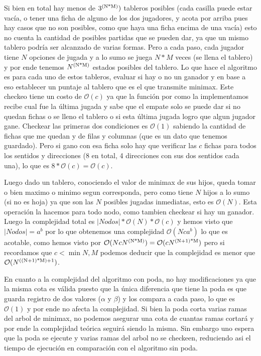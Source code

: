 \documentclass[A4paper,oneside,fleqn,11pt]{article}
\theoremstyle{definition}
\begin{document}
Si bien en total hay  menos de $3\textsuperscript{(N*M)})$ tableros posibles (cada casilla puede estar vacía, o tener una ficha de alguno de los dos jugadores, y acota por arriba pues hay casos que no son posibles, como que haya una ficha encima de una vacía) esto no cuenta la cantidad de posibles partidas que se pueden dar, ya que un mismo tablero podría ser alcanzado de varias formas. Pero a cada paso, cada jugador tiene $N$ opciones de jugada y a lo sumo se juega $N*M$ veces (se llena el tablero) y por ende tenemos $N\textsuperscript{(N*M)}$ estados posibles del tablero. Lo que hace el algoritmo es para cada uno de estos tableros, evaluar si hay o no un ganador y en base a eso establecer un puntaje al tablero que es el que transmite minimax. Este checkeo tiene un costo de $\mathcal{O}(c)$ ya que la función por como la implementamos recibe cual fue la última jugada y sabe que el empate solo se puede dar si no quedan fichas o se lleno el tablero o si esta última jugada logro que algun jugador gane. Checkear las primeras dos condiciones es $\mathcal{O}(1)$ sabiendo la cantidad de fichas que me quedan y de filas y columnas (que es un dato que tenemos guardado). Pero si gano con esa ficha solo hay que verificar las $c$ fichas para todos los sentidos y direcciones (8 en total, 4 direcciones con sus dos sentidos cada una), lo que es $8* \mathcal{O}(c)= \mathcal{O}(c)$. 

Luego dado un tablero, conociendo el valor de minimax de sus hijos, queda tomar o bien maximo o minimo segun corresponda, pero como tiene $N$ hijos a lo sumo (si no es hoja) ya que son las $N$ posibles jugadas inmediatas, esto es $\mathcal{O}(N)$. Esta operación la hacemos para todo nodo, como tambien checkear si hay un ganador. Luego la complejidad total es $|Nodos|*\mathcal{O}(N)*\mathcal{O}(c)$ y hemos visto que $|Nodos|=a^b$ por lo que obtenemos una complejidad $\mathcal{O}(N c a^b)$ lo que es acotable, como hemos visto por $\mathcal{O}(N c N\textsuperscript{(N*M)})=\mathcal{O}(c N\textsuperscript{(N+1)*M})$ pero si recordamos que $c<\min{N,M}$ podemos deducir que la complejidad es menor que $\mathcal{O}(N\textsuperscript{((N+1)*M)+1})$.

En cuanto a la complejidad del algoritmo con poda, no hay modificaciones ya que la misma cota es válida puesto que la única diferencia que tiene la poda es que guarda registro de dos valores ($\alpha$ y $\beta$) y los compara a cada paso, lo que es $\mathcal{O}(1)$ y por ende no afecta la complejidad. Si bien la poda corta varias ramas del arbol de minimax, no podemos asegurar una cota de cuantas ramas cortará y por ende la complejidad teórica seguirá siendo la misma. Sin embargo uno espera que la poda se ejecute y varias ramas del arbol no se checkeen, reduciendo asi el tiempo de ejecución en comparación con el algoritmo sin poda.
\end{document}
